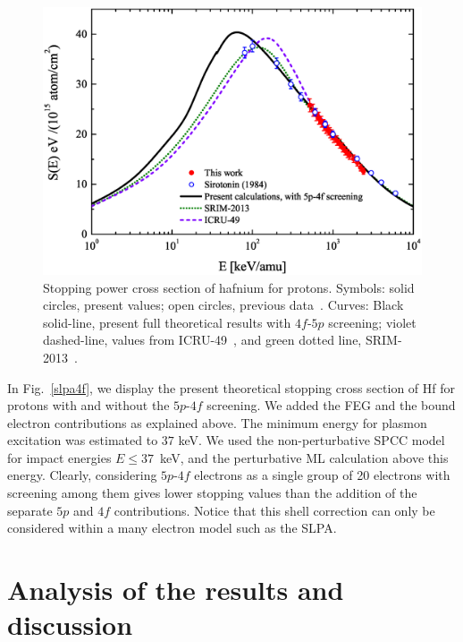 \documentclass[aps,pra,reprint,groupedaddress,showpacs,showkeys]{revtex4-1}
\begin{document}
\begin{figure}[!t]
\centering
\includegraphics[width=13.0cm]{Fig03.eps}
\caption{Stopping power cross section of hafnium for protons. Symbols: 
solid circles, present values; open circles, previous data~\cite{Sirotinin}. 
Curves: Black solid-line, present full theoretical results with 
$4f$-$5p$ screening; violet dashed-line, values from ICRU-49~\cite{ICRU49}, 
and green dotted line, SRIM-2013~\cite{Ziegler01}.}
\label{F03}
\end{figure}

In Fig.~\ref{slpa4f}, we display the present theoretical stopping cross 
section of Hf for protons with and without the $5p$-$4f$ screening. We 
added the FEG and the bound electron contributions as explained above. 
The minimum energy for plasmon excitation was estimated to $37$ keV. We 
used the non-perturbative SPCC model for impact energies $E \leq 37$~keV, 
and the perturbative ML calculation above this energy. Clearly, 
considering $5p$-$4f$ electrons as a single group of 20 electrons with 
screening among them gives lower stopping values than the addition of 
the separate $5p$ and $4f$ contributions. Notice that this shell 
correction can only be considered within a many electron model such as 
the SLPA.

\section{Analysis of the results and discussion}
\label{discussion}
\end{document}
